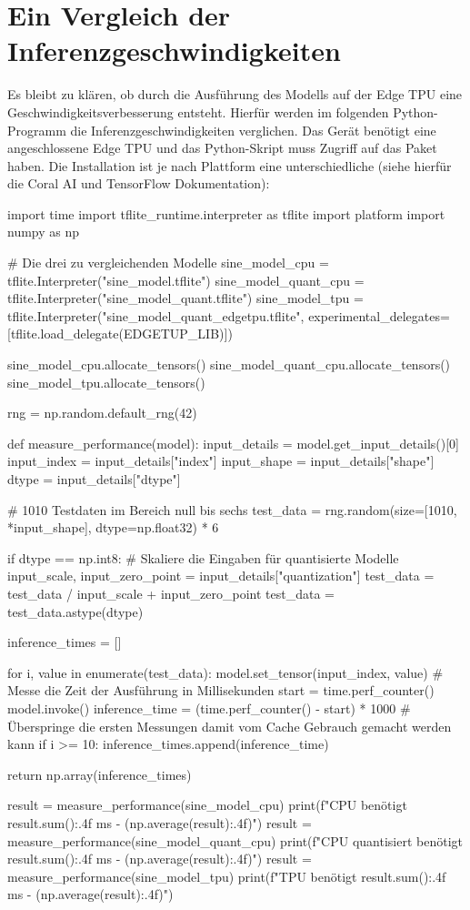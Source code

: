 \section{Ein Vergleich der Inferenzgeschwindigkeiten}
Es bleibt zu klären, ob durch die Ausführung des Modells
auf der Edge TPU eine Geschwindigkeitsverbesserung entsteht.
Hierfür werden im folgenden Python-Programm die
Inferenzgeschwindigkeiten verglichen.
Das Gerät benötigt eine angeschlossene Edge TPU
und das Python-Skript muss Zugriff auf
das  Paket haben.
Die Installation ist je nach Plattform eine unterschiedliche
(siehe hierfür die Coral AI und TensorFlow Dokumentation):
\begin{pythoncode}
import time
import tflite_runtime.interpreter as tflite
import platform
import numpy as np

# Die drei zu vergleichenden Modelle
sine_model_cpu = tflite.Interpreter("sine_model.tflite")
sine_model_quant_cpu = tflite.Interpreter("sine_model_quant.tflite")
sine_model_tpu = tflite.Interpreter("sine_model_quant_edgetpu.tflite",
    experimental_delegates=[tflite.load_delegate(EDGETUP_LIB)])

sine_model_cpu.allocate_tensors()
sine_model_quant_cpu.allocate_tensors()
sine_model_tpu.allocate_tensors()

rng = np.random.default_rng(42)

def measure_performance(model):
    input_details = model.get_input_details()[0]
    input_index = input_details["index"]
    input_shape = input_details["shape"]
    dtype = input_details["dtype"]

    # 1010 Testdaten im Bereich null bis sechs
    test_data = rng.random(size=[1010, *input_shape], dtype=np.float32) * 6

    if dtype == np.int8:
        # Skaliere die Eingaben für quantisierte Modelle
        input_scale, input_zero_point = input_details["quantization"]
        test_data = test_data / input_scale + input_zero_point
        test_data = test_data.astype(dtype)

    inference_times = []

    for i, value in enumerate(test_data):
        model.set_tensor(input_index, value)
        # Messe die Zeit der Ausführung in Millisekunden
        start = time.perf_counter()
        model.invoke()
        inference_time = (time.perf_counter() - start) * 1000
        # Überspringe die ersten Messungen damit vom Cache Gebrauch gemacht werden kann
        if i >= 10:
            inference_times.append(inference_time)

    return np.array(inference_times)

result = measure_performance(sine_model_cpu)
print(f"CPU benötigt {result.sum():.4f} ms - ({np.average(result):.4f})")
result = measure_performance(sine_model_quant_cpu)
print(f"CPU quantisiert benötigt {result.sum():.4f} ms - ({np.average(result):.4f})")
result = measure_performance(sine_model_tpu)
print(f"TPU benötigt {result.sum():.4f} ms - ({np.average(result):.4f})")
\end{pythoncode}
